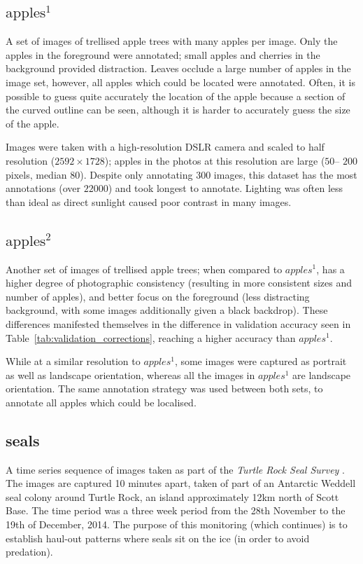\subsection{\texorpdfstring{$\mathrm{apples^1}$}{}}

A set of images of trellised apple trees with many apples per image. Only the apples in the foreground were annotated; small apples and cherries in the background provided distraction. Leaves occlude a large number of apples in the image set, however, all apples which could be located were annotated. Often, it is possible to guess quite accurately the location of the apple because a section of the curved outline can be seen, although it is harder to accurately guess the size of the apple. 

Images were taken with a high-resolution DSLR camera and scaled to half resolution ($2592\times1728$); apples in the photos at this resolution are large ($50$-- $200$ pixels, median $80$). Despite only annotating 300 images, this dataset has the most annotations (over $22000$) and took longest to annotate. Lighting was often less than ideal as direct sunlight caused poor contrast in many images.
    
\subsection{\texorpdfstring{$\mathrm{apples^2}$}{}}
    
Another set of images of trellised apple trees; when compared to \emph{$apples^1$}, has a higher degree of  photographic consistency (resulting in more consistent sizes and number of apples), and better focus on the foreground (less distracting background, with some images additionally given a black backdrop). These differences manifested themselves in the difference in validation accuracy seen in Table~\ref{tab:validation_corrections}, reaching a higher accuracy than \emph{$apples^1$}.

While at a similar resolution to \emph{$apples^1$}, some images were captured as portrait as well as landscape orientation, whereas all the images in \emph{$apples^1$} are landscape orientation. The same annotation strategy was used between both sets, to annotate all apples which could be localised.

\subsection{seals}
    
 A time series sequence of images taken as part of the \emph{Turtle Rock Seal Survey} \cite{Eisert2015}. The images are captured 10 minutes apart, taken of part of an Antarctic Weddell seal colony around Turtle Rock, an island approximately 12km north of Scott Base. The time period was a three week period from the 28th November to the 19th of December, 2014. The purpose of this monitoring (which continues) is to establish haul-out patterns where seals sit on the ice (in order to avoid predation).  

